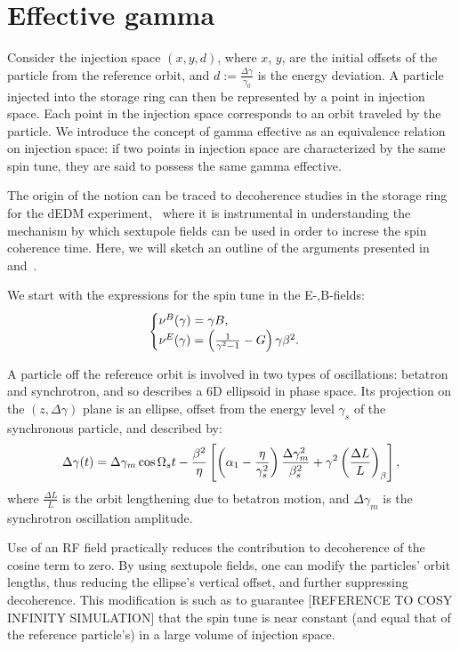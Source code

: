 \documentclass{article}
\begin{document}
\section{Effective gamma}
Consider the injection space $(x,y,d)$, where $x$, $y$, are the initial offsets of the particle from the reference orbit, and $d := \frac{\Delta\gamma}{\gamma_0}$ is the energy deviation. A particle injected into the storage ring can then be represented by a point in injection space. Each point in the injection space corresponds to an orbit traveled by the particle. We introduce the concept of gamma effective as an equivalence relation on injection space: if two points in injection space are characterized by the same spin tune, they are said to possess the same gamma effective.

The origin of the notion can be traced to decoherence studies in the storage ring for the dEDM experiment,~\cite{Senichev:StorageRingMethod} where it is instrumental in understanding the mechanism by which sextupole fields can be used in order to increse the spin coherence time. Here, we will sketch an outline of the arguments presented in~\cite{Senichev:StorageRingMethod} and~\cite{Senichev:Decoh}.

We start with the expressions for the spin tune in the E-,B-fields:
\begin{equation}\label{eq:spin_tune}
  \begin{cases}
    \nu^B(\gamma) = \gamma B,\\
    \nu^E(\gamma) = \bkt{\frac{1}{\gamma^2-1}-G}\gamma\beta^2.
  \end{cases}
\end{equation}

A particle off the reference orbit is involved in two types of oscillations: betatron and synchrotron, and so describes a 6D ellipsoid in phase space. Its projection on the $(z, \Delta\gamma)$ plane is an ellipse, offset from the energy level $\gamma_s$ of the synchronous particle, and described by:~\cite[p. 2580]{Senichev:Decoh}
\begin{equation}\label{eq:delta_gamma}
  \Delta\gamma(t) = \Delta\gamma_m\cos\Omega_s t - \frac{\beta^2}{\eta}\bkt*{\bkt{\alpha_1 - \frac{\eta}{\gamma_s^2}}\frac{\Delta\gamma_m^2}{\beta_s^2} + \gamma^2\bkt{\frac{\Delta L}{L}}_\beta},
\end{equation}
where $\frac{\Delta L}{L}$ is the orbit lengthening due to betatron motion, and $\Delta\gamma_m$ is the synchrotron oscillation amplitude. 

Use of an RF field practically reduces the contribution to decoherence of the cosine term to zero. By using sextupole fields, one can modify the particles' orbit lengths, thus reducing the ellipse's vertical offset, and further suppressing decoherence. This modification is such as to guarantee [REFERENCE TO COSY INFINITY SIMULATION] that the spin tune is near constant (and equal that of the reference particle's) in a large volume of injection space.
\end{document}
